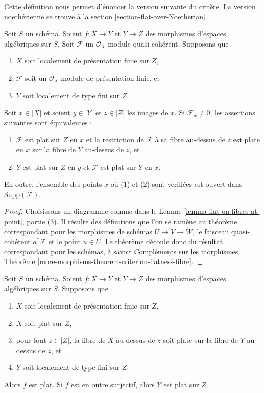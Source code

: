 \noindent
Cette définition nous permet d'énoncer la version suivante du critère.
La version noethérienne se trouve à la
section \ref{section-flat-over-Noetherian}.

\begin{theorem}
\label{theorem-criterion-flatness-fibre}
Soit $S$ un schéma.
Soient $f : X \to Y$ et $Y \to Z$ des morphismes d'espaces algébriques sur $S$.
Soit $\mathcal{F}$ un $\mathcal{O}_X$-module quasi-cohérent.
Supposons que
\begin{enumerate}
\item $X$ soit localement de présentation finie sur $Z$,
\item $\mathcal{F}$ soit un $\mathcal{O}_X$-module de présentation finie, et
\item $Y$ soit localement de type fini sur $Z$.
\end{enumerate}
Soit $x \in |X|$ et soient $y \in |Y|$ et $z \in |Z|$ les images de
$x$. Si $\mathcal{F}_{\overline{x}} \not = 0$, les assertions suivantes sont
équivalentes :
\begin{enumerate}
\item $\mathcal{F}$ est plat sur $Z$ en $x$ et
la restriction de $\mathcal{F}$ à sa fibre au-dessus de $z$
est plate en $x$ sur la fibre de $Y$ au-dessus de $z$, et
\item $Y$ est plat sur $Z$ en $y$ et $\mathcal{F}$ est
plat sur $Y$ en $x$.
\end{enumerate}
En outre, l'ensemble des points $x$ où (1) et (2) sont vérifiées est ouvert dans
$\text{Supp}(\mathcal{F})$.
\end{theorem}

\begin{proof}
Choisissons un diagramme comme dans le
Lemme \ref{lemma-flat-on-fibres-at-point}, partie (3).
Il résulte des définitions que l'on se ramène au
théorème correspondant pour les morphismes de schémas
$U \to V \to W$, le faisceau quasi-cohérent $a^*\mathcal{F}$
et le point $u \in U$. Le théorème découle donc du
résultat correspondant pour les schémas, à savoir
Compléments sur les morphismes,
Théorème \ref{more-morphisms-theorem-criterion-flatness-fibre}.
\end{proof}

\begin{lemma}
\label{lemma-morphism-between-flat}
Soit $S$ un schéma.
Soient $f : X \to Y$ et $Y \to Z$ des morphismes d'espaces algébriques sur $S$.
Supposons que
\begin{enumerate}
\item $X$ soit localement de présentation finie sur $Z$,
\item $X$ soit plat sur $Z$,
\item pour tout $z \in |Z|$, la fibre de $X$ au-dessus de $z$
soit plate sur la fibre de $Y$ au-dessus de $z$, et
\item $Y$ soit localement de type fini sur $Z$.
\end{enumerate}
Alors $f$ est plat. Si $f$ est en outre surjectif, alors $Y$ est plat sur $Z$.
\end{lemma}

